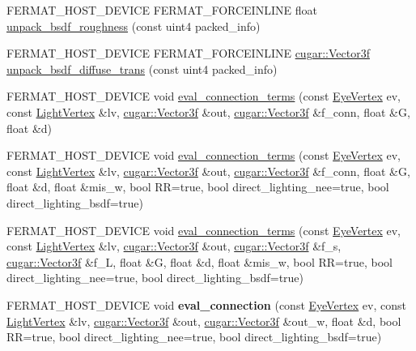 \begin{DoxyCompactItemize}
\item 
F\+E\+R\+M\+A\+T\+\_\+\+H\+O\+S\+T\+\_\+\+D\+E\+V\+I\+CE F\+E\+R\+M\+A\+T\+\_\+\+F\+O\+R\+C\+E\+I\+N\+L\+I\+NE float \hyperlink{group___b_p_t_lib_core_ga51ab08450720cf29963a5ea1ba68f600}{unpack\+\_\+bsdf\+\_\+roughness} (const uint4 packed\+\_\+info)
\item 
F\+E\+R\+M\+A\+T\+\_\+\+H\+O\+S\+T\+\_\+\+D\+E\+V\+I\+CE F\+E\+R\+M\+A\+T\+\_\+\+F\+O\+R\+C\+E\+I\+N\+L\+I\+NE \hyperlink{structcugar_1_1_vector}{cugar\+::\+Vector3f} \hyperlink{group___b_p_t_lib_core_ga6622eb324770dae8cd60dc5b6def876a}{unpack\+\_\+bsdf\+\_\+diffuse\+\_\+trans} (const uint4 packed\+\_\+info)
\item 
F\+E\+R\+M\+A\+T\+\_\+\+H\+O\+S\+T\+\_\+\+D\+E\+V\+I\+CE void \hyperlink{group___b_p_t_lib_core_gab2057368defff97d2e5a217450c9ec9b}{eval\+\_\+connection\+\_\+terms} (const \hyperlink{struct_eye_vertex}{Eye\+Vertex} ev, const \hyperlink{struct_light_vertex}{Light\+Vertex} \&lv, \hyperlink{structcugar_1_1_vector}{cugar\+::\+Vector3f} \&out, \hyperlink{structcugar_1_1_vector}{cugar\+::\+Vector3f} \&f\+\_\+conn, float \&G, float \&d)
\item 
F\+E\+R\+M\+A\+T\+\_\+\+H\+O\+S\+T\+\_\+\+D\+E\+V\+I\+CE void \hyperlink{group___b_p_t_lib_core_ga630c6ca6bd993457e69d47dda397e6a3}{eval\+\_\+connection\+\_\+terms} (const \hyperlink{struct_eye_vertex}{Eye\+Vertex} ev, const \hyperlink{struct_light_vertex}{Light\+Vertex} \&lv, \hyperlink{structcugar_1_1_vector}{cugar\+::\+Vector3f} \&out, \hyperlink{structcugar_1_1_vector}{cugar\+::\+Vector3f} \&f\+\_\+conn, float \&G, float \&d, float \&mis\+\_\+w, bool RR=true, bool direct\+\_\+lighting\+\_\+nee=true, bool direct\+\_\+lighting\+\_\+bsdf=true)
\item 
F\+E\+R\+M\+A\+T\+\_\+\+H\+O\+S\+T\+\_\+\+D\+E\+V\+I\+CE void \hyperlink{group___b_p_t_lib_core_ga4aa55c80f176afb93197d76f8eb77751}{eval\+\_\+connection\+\_\+terms} (const \hyperlink{struct_eye_vertex}{Eye\+Vertex} ev, const \hyperlink{struct_light_vertex}{Light\+Vertex} \&lv, \hyperlink{structcugar_1_1_vector}{cugar\+::\+Vector3f} \&out, \hyperlink{structcugar_1_1_vector}{cugar\+::\+Vector3f} \&f\+\_\+s, \hyperlink{structcugar_1_1_vector}{cugar\+::\+Vector3f} \&f\+\_\+L, float \&G, float \&d, float \&mis\+\_\+w, bool RR=true, bool direct\+\_\+lighting\+\_\+nee=true, bool direct\+\_\+lighting\+\_\+bsdf=true)
\item 
\mbox{\label{group___b_p_t_lib_core_gae60b78f9de82f098e74de5a59fc06985}} 
F\+E\+R\+M\+A\+T\+\_\+\+H\+O\+S\+T\+\_\+\+D\+E\+V\+I\+CE void {\bfseries eval\+\_\+connection} (const \hyperlink{struct_eye_vertex}{Eye\+Vertex} ev, const \hyperlink{struct_light_vertex}{Light\+Vertex} \&lv, \hyperlink{structcugar_1_1_vector}{cugar\+::\+Vector3f} \&out, \hyperlink{structcugar_1_1_vector}{cugar\+::\+Vector3f} \&out\+\_\+w, float \&d, bool RR=true, bool direct\+\_\+lighting\+\_\+nee=true, bool direct\+\_\+lighting\+\_\+bsdf=true)

\end{DoxyCompactItemize}
